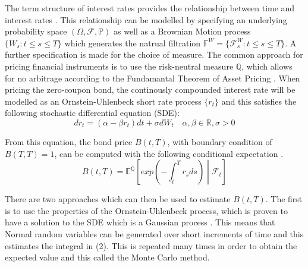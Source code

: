 \documentclass[12pt,a4paper]{article}
\begin{document}
The term structure of interest rates provides the relationship between time and interest rates \citep{hull2016options}. This relationship can be modelled by specifying an underlying probability space $(\Omega,\mathcal{F},\mathbb{P})$ as well as a Brownian Motion process $\{W_{s}:t \leq s \leq T\}$ which generates the natrual filtration $\mathbb{F}^{W} = \{\mathcal{F}_{s}^{W}: t \leq s \leq T\}$. A further specification is made for the choice of measure. The common approach for pricing financial instruments is to use the risk-neutral measure $\mathbb{Q}$, which allows for no arbitrage according to the Fundamantal Theorem of Asset Pricing \citep{shreve2004stochastic}. When pricing the zero-coupon bond, the continously compounded interest rate will be modelled as an Ornstein-Uhlenbeck short rate process $\{r_t\}$ and this satisfies the following stochastic differential equation (SDE): 
\begin{equation}
dr_{t} = (\alpha-\beta r_{t})dt + \sigma dW_{t} \quad \alpha, \beta \in \mathbb{R}, \sigma>0
\end{equation}

From this equation, the bond price $B(t,T)$, with boundary condition of $B(T,T) = 1$, can be computed with the following conditional expectation \citep{mamon2004three}.
\begin{equation}
B(t,T) = \mathbb{E}^{\mathbb{Q}}\left[exp\left(-\int_{t}^{T}r_{s} ds\right)\middle\vert\mathcal{F}_{t}\right]
\end{equation}

There are two approaches which can then be used to estimate $B(t,T)$. The first is to use the properties of the Ornstein-Uhlenbeck process, which is proven to have a solution to the SDE which is a Gaussian process \citep{finch2004ornstein}. This means that Normal random variables can be generated over short increments of time and this estimates the integral in (2). This is repeated many times in order to obtain the expected value and this called the Monte Carlo method.
\end{document}
